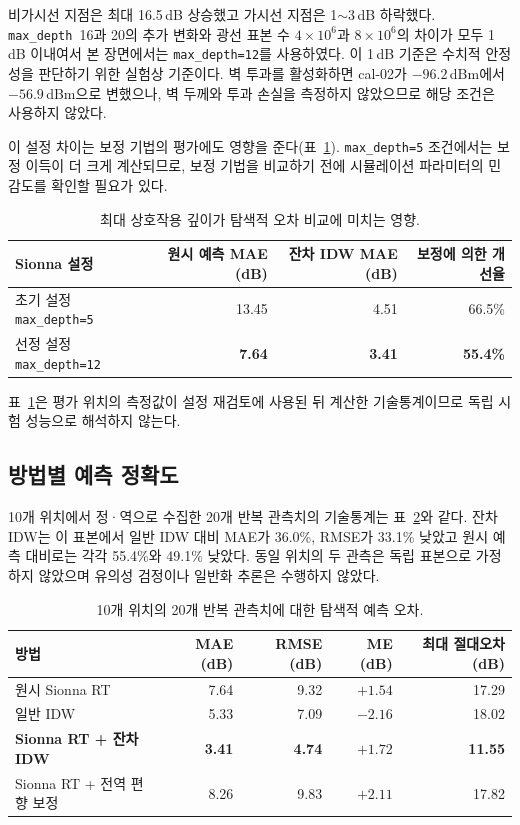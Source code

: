 \documentclass[11pt,a4paper]{article}
\newcommand{\md}{\texttt{max\_depth}}
\begin{document}
비가시선 지점은 최대 16.5\,dB 상승했고 가시선 지점은 1$\sim$3\,dB 하락했다. \md\ 16과 20의 추가
변화와 광선 표본 수 $4\times10^{6}$과 $8\times10^{6}$의 차이가 모두 1\,dB 이내여서 본 장면에서는
\texttt{max\_depth=12}를 사용하였다. 이 1\,dB 기준은 수치적 안정성을 판단하기 위한 실험상 기준이다.
벽 투과를 활성화하면 cal-02가 $-96.2$\,dBm에서 $-56.9$\,dBm으로 변했으나, 벽 두께와 투과 손실을
측정하지 않았으므로 해당 조건은 사용하지 않았다.

이 설정 차이는 보정 기법의 평가에도 영향을 준다(표~\ref{tab:depth-eval}).
\texttt{max\_depth=5} 조건에서는 보정 이득이 더 크게 계산되므로, 보정 기법을 비교하기 전에 시뮬레이션
파라미터의 민감도를 확인할 필요가 있다.

\begin{table}[htbp]
  \centering\small
  \caption{최대 상호작용 깊이가 탐색적 오차 비교에 미치는 영향.}
  \label{tab:depth-eval}
  \begin{tabular}{@{}lrrr@{}}
    \toprule
    Sionna 설정 & 원시 예측 MAE (dB) & 잔차 IDW MAE (dB) & 보정에 의한 개선율 \\
    \midrule
    초기 설정 \texttt{max\_depth=5}  & 13.45 & 4.51 & 66.5\% \\
    선정 설정 \texttt{max\_depth=12} & \textbf{7.64} & \textbf{3.41} & \textbf{55.4\%} \\
    \bottomrule
  \end{tabular}
\end{table}

표~\ref{tab:depth-eval}은 평가 위치의 측정값이 설정 재검토에 사용된 뒤 계산한 기술통계이므로 독립 시험
성능으로 해석하지 않는다.

\subsection{방법별 예측 정확도}

10개 위치에서 정·역으로 수집한 20개 반복 관측치의 기술통계는 표~\ref{tab:acc}와 같다. 잔차 IDW는 이
표본에서 일반 IDW 대비 MAE가 36.0\%, RMSE가 33.1\% 낮았고 원시 예측 대비로는 각각 55.4\%와
49.1\% 낮았다. 동일 위치의 두 관측은 독립 표본으로 가정하지 않았으며 유의성 검정이나 일반화 추론은
수행하지 않았다.

\begin{table}[htbp]
  \centering\small
  \caption{10개 위치의 20개 반복 관측치에 대한 탐색적 예측 오차.}
  \label{tab:acc}
  \begin{tabular}{@{}lrrrr@{}}
    \toprule
    방법 & MAE (dB) & RMSE (dB) & ME (dB) & 최대 절대오차 (dB) \\
    \midrule
    원시 Sionna RT & 7.64 & 9.32 & $+1.54$ & 17.29 \\
    일반 IDW & 5.33 & 7.09 & $-2.16$ & 18.02 \\
    \textbf{Sionna RT + 잔차 IDW} & \textbf{3.41} & \textbf{4.74} & $+1.72$ & \textbf{11.55} \\
    Sionna RT + 전역 편향 보정 & 8.26 & 9.83 & $+2.11$ & 17.82 \\
    \bottomrule
  \end{tabular}
\end{table}
\end{document}

